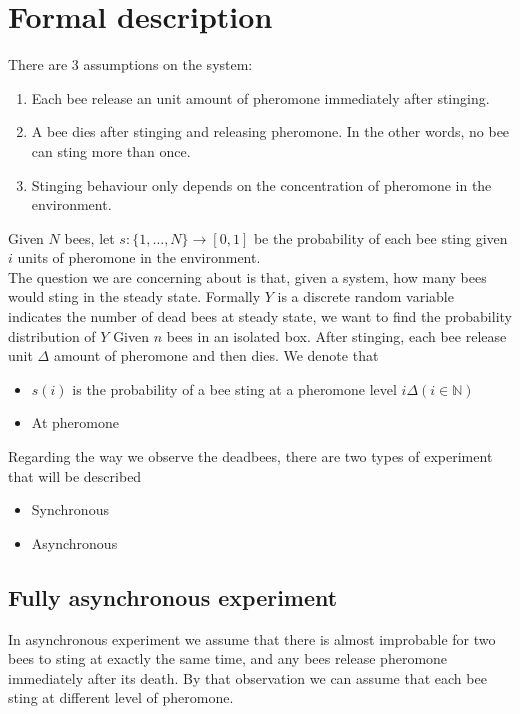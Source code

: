 \documentclass[12pt]{article}
\begin{document}
\section{Formal description}
There are 3 assumptions on the system:
\begin{enumerate}
\item Each bee release an unit amount of pheromone immediately after stinging.
\item A bee dies after stinging and releasing pheromone. In the other words, no
  bee can sting more than once.
\item Stinging behaviour only depends on the concentration of pheromone in the
  environment.
\end{enumerate}
Given $N$ bees, let $s:\{1,\ldots,N\}\rightarrow[0,1]$ be the probability of
each bee sting given $i$ units of pheromone in the environment.\\

The question we are concerning about is that, given a system, how many bees
would sting in the steady state. Formally $Y$ is a discrete random variable
indicates the number of dead bees at steady state, we want to find the
probability distribution of $Y$ Given $n$ bees in an isolated box. After
stinging, each bee release unit $\Delta$ amount of pheromone and then dies. We
denote that
\begin{itemize}
\item $s(i)$ is the probability of a bee sting at a pheromone level $i\Delta
  (i\in \mathbb{N})$
\item At pheromone 
\end{itemize}

Regarding the way we observe the deadbees, there are two types of experiment
that will be described
\begin{itemize}
\item Synchronous
\item Asynchronous
\end{itemize}

\subsection{Fully asynchronous experiment}
In asynchronous experiment we assume that there is almost improbable for two
bees to sting at exactly the same time, and any bees release pheromone
immediately after its death. By that observation we can assume that each bee
sting at different level of pheromone.\\
\end{document}
